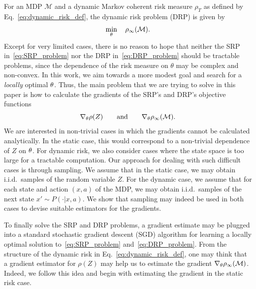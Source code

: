 \documentclass{article} %
\begin{document}
For an MDP $\mathcal{M}$ and a dynamic Markov coherent risk measure $\rho_T$ as defined by Eq.~\ref{eq:dynamic_risk_def}, the dynamic risk problem (DRP) is given by
%
\begin{equation}\label{eq:DRP_problem}
    \min_{\theta} \quad \rho_\infty(\mathcal{M}).
\end{equation}
Except for very limited cases, there is no reason to hope that neither the SRP in~\eqref{eq:SRP_problem} nor the DRP in~\eqref{eq:DRP_problem} should be tractable problems, since the dependence of the risk measure on $\theta$ may be complex and non-convex. %
In this work, we aim towards a more modest goal and search for a \emph{locally} optimal $\theta$. Thus, the main problem that we are trying to solve in this paper is how to calculate the gradients of the SRP's and DRP's objective functions
%
\begin{equation*}
    \nabla_{\theta} \rho(Z) \quad\quad \text{and} \quad\quad \nabla_{\theta} \rho_\infty(\mathcal{M}).
\end{equation*}
%
We are interested in non-trivial cases in which the gradients cannot be calculated analytically. In the static case, this would correspond to a non-trivial dependence of $Z$ on $\theta$. For dynamic risk, we also consider cases where the state space is too large for a tractable computation. Our approach for dealing with such difficult cases is through sampling. We assume that in the static case, we may obtain i.i.d.~samples of the random variable $Z$. For the dynamic case, we assume that for each state and action $(x,a)$ of the MDP, we may obtain i.i.d.~samples of the next state $x'\sim P(\cdot|x,a)$. We show that sampling may indeed be used in both cases to devise suitable estimators for the gradients.

To finally solve the SRP and DRP problems, a gradient estimate may be plugged into a standard stochastic gradient descent (SGD) algorithm for learning a locally optimal solution to~\eqref{eq:SRP_problem} and~\eqref{eq:DRP_problem}. %
From the structure of the dynamic risk in Eq.~\ref{eq:dynamic_risk_def}, one may think that a gradient estimator for $\rho(Z)$ may help us to estimate the gradient $\nabla_{\theta} \rho_\infty(\mathcal{M})$. Indeed, we follow this idea and begin with estimating the gradient in the static risk case.
\end{document}
